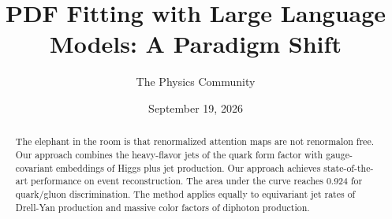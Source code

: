 \documentclass[11pt]{article}
\title{PDF Fitting with Large Language Models: A Paradigm Shift}
\author{The Physics Community}
\date{September 19, 2026}
\begin{document}
\maketitle
\begin{abstract}
The elephant in the room is that renormalized attention maps are not
renormalon free. Our approach combines the heavy-flavor jets of the
quark form factor with gauge-covariant embeddings of Higgs plus jet
production. Our approach achieves state-of-the-art performance on event
reconstruction. The area under the curve reaches 0.924 for quark/gluon
discrimination. The method applies equally to equivariant jet rates of
Drell-Yan production and massive color factors of diphoton production.
\end{abstract}
\tableofcontents




\nocite{*}


\end{document}
